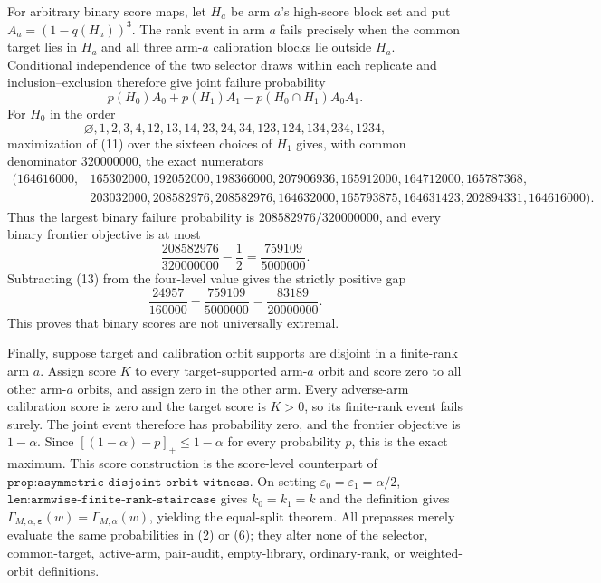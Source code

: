 For arbitrary binary score maps, let \(H_a\) be arm \(a\)'s high-score block set and put \(A_a=(1-q(H_a))^3\). The rank event in arm \(a\) fails precisely when the common target lies in \(H_a\) and all three arm-\(a\) calibration blocks lie outside \(H_a\). Conditional independence of the two selector draws within each replicate and inclusion--exclusion therefore give joint failure probability
\[
p(H_0)A_0+p(H_1)A_1-p(H_0\cap H_1)A_0A_1.
\tag{11}
\]
For \(H_0\) in the order
\[
\varnothing,1,2,3,4,12,13,14,23,24,34,123,124,134,234,1234,
\]
maximization of (11) over the sixteen choices of \(H_1\) gives, with common denominator \(320000000\), the exact numerators
\[
\begin{split}
(164616000,&165302000,192052000,198366000,207906936,165912000,164712000,165787368,\\
&203032000,208582976,208582976,164632000,165793875,164631423,202894331,164616000).
\end{split}
\tag{12}
\]
Thus the largest binary failure probability is \(208582976/320000000\), and every binary frontier objective is at most
\[
\frac{208582976}{320000000}-\frac12=\frac{759109}{5000000}.
\tag{13}
\]
Subtracting (13) from the four-level value gives the strictly positive gap
\[
\frac{24957}{160000}-\frac{759109}{5000000}=\frac{83189}{20000000}.
\tag{14}
\]
This proves that binary scores are not universally extremal.

Finally, suppose target and calibration orbit supports are disjoint in a finite-rank arm \(a\). Assign score \(K\) to every target-supported arm-\(a\) orbit and score zero to all other arm-\(a\) orbits, and assign zero in the other arm. Every adverse-arm calibration score is zero and the target score is \(K>0\), so its finite-rank event fails surely. The joint event therefore has probability zero, and the frontier objective is \(1-\alpha\). Since \([(1-\alpha)-p]_+\le1-\alpha\) for every probability \(p\), this is the exact maximum. This score construction is the score-level counterpart of \(\texttt{prop:asymmetric-disjoint-orbit-witness}\). On setting \(\varepsilon_0=\varepsilon_1=\alpha/2\), \(\texttt{lem:armwise-finite-rank-staircase}\) gives \(k_0=k_1=k\) and the definition gives \(\Gamma_{M,\alpha,\boldsymbol\varepsilon}(w)=\Gamma_{M,\alpha}(w)\), yielding the equal-split theorem. All prepasses merely evaluate the same probabilities in (2) or (6); they alter none of the selector, common-target, active-arm, pair-audit, empty-library, ordinary-rank, or weighted-orbit definitions.